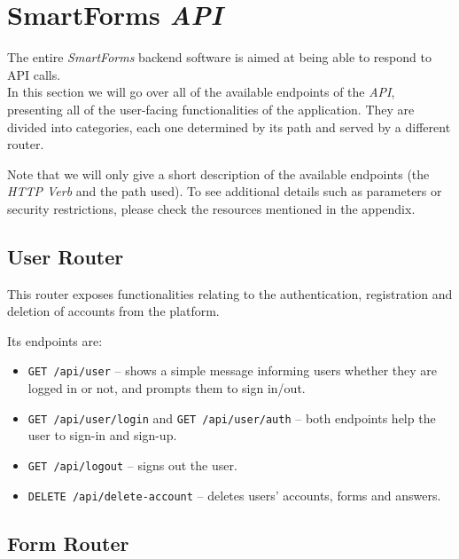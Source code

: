 \documentclass[11pt, a4paper]{report}
\def\code#1{\texttt{#1}}
\begin{document}
\section{SmartForms \textit{API}}

The entire \textit{SmartForms} backend software is aimed at being able to respond to API calls.\\
In this section we will go over all of the available endpoints of the \textit{API}, presenting all of the user-facing functionalities of the application. They are divided into categories, each one determined by its path and served by a different router.

Note that we will only give a short description of the available endpoints (the \textit{HTTP Verb} and the path used). To see additional details such as parameters or security restrictions, please check the resources mentioned in the appendix.

\subsection{User Router}

This router exposes functionalities relating to the authentication, registration and deletion of accounts from the platform.

Its endpoints are:
\begin{itemize}
    \item \code{GET /api/user} -- shows a simple message informing users whether they are logged in or not, and prompts them to sign in/out.
    \item \code{GET /api/user/login} and \code{GET /api/user/auth} -- both endpoints help the user to sign-in and sign-up.
    \item \code{GET /api/logout} -- signs out the user.
    \item \code{DELETE /api/delete-account} -- deletes users' accounts, forms and answers.
\end{itemize}

\subsection{Form Router}
\end{document}
